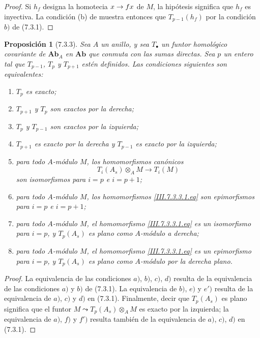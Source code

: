 \documentclass[10pt,oneside,openany]{book}
\theoremstyle{egaenv}\newtheorem*{env}{---}
\theoremstyle{egastatement}
\newtheorem*{proposition}{Proposición}
\theoremstyle{egadescription}
\renewcommand{\to}{\mathchoice{\longrightarrow}{\rightarrow}{\rightarrow}{\rightarrow}}
\begin{document}
\begin{proof}
Si $h_f$ designa la homotecia $x\to fx$ de $M$, la hipótesis
significa que $h_f$ es inyectiva. La condición (b) de
 muestra entonces que $T_{p-1}(h_f)$ por
la condición $b)$ de (7.3.1).
\end{proof}

\begin{proposition}[7.3.3]
\label{III.7.3.3}
Sea $A$ un anillo, y sea $T_\bullet$ un funtor homológico
covariante de $\boldsymbol{Ab}_A$ en $\boldsymbol{Ab}$ que conmuta con las
sumas directas. Sea $p$ un entero tal que $T_{p-1}$, $T_p$ y
$T_{p+1}$ estén definidos. Las condiciones siguientes son
equivalentes:
\begin{enumerate}
  \item[(a)] $T_p$ es exacto;
  \item[(b)] $T_{p+1}$ y $T_p$ son exactos por la derecha;
  \item[(c)] $T_p$ y $T_{p-1}$ son exactos por la izquierda;
  \item[(d)] $T_{p+1}$ es exacto por la derecha y $T_{p-1}$ es
    exacto por la izquierda;
  \item[(e)] para todo $A$-módulo $M$, los homomorfismos canónicos
    \[
      T_i(A_s)\otimes_A M\longrightarrow T_i(M)
      \tag{7.3.3.1}\label{III.7.3.3.1.fr}
    \]
    son isomorfismos para $i=p$ e $i=p+1$;
  \item[($e'$)] para todo $A$-módulo $M$, los
    homomorfismos \eqref{III.7.3.3.1.eq} son epimorfismos para
    $i=p$ e $i=p+1$;
  \item[(f)] para todo $A$-módulo $M$, el homomorfismo
    \eqref{III.7.3.3.1.eq} es un isomorfismo para $i=p$, y
    $T_p(A_s)$ es plano como $A$-módulo a derecha;
  \item[($f'$)] para todo $A$-módulo $M$, el
    homomorfismo \eqref{III.7.3.3.1.eq} es un epimorfismo para
    $i=p$, y $T_p(A_s)$ es plano como $A$-módulo por la derecha plano.
\end{enumerate}
\end{proposition}

\begin{proof}
La equivalencia de las condiciones $a)$, $b)$, $c)$, $d)$ resulta de la equivalencia
de las condiciones $a)$ y $b)$ de (7.3.1). La equivalencia de $b)$, $e)$ y $e')$
resulta de la equivalencia de $a)$, $c)$ y $d)$ en (7.3.1). Finalmente, decir que
$T_p(A_s)$
es plano significa que el funtor
$M\leadsto T_p(A_s)\otimes_A M$
es exacto por la izquierda; la equivalencia de $a)$, $f)$ y $f')$ resulta también de
la equivalencia de $a)$, $c)$, $d)$ en (7.3.1).
\end{proof}
\end{document}
